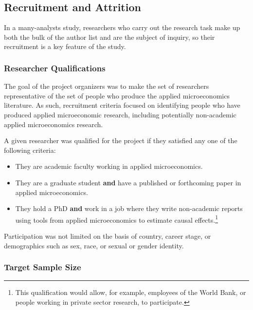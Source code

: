 \documentclass[
  letterpaper,
  DIV=11,
  numbers=noendperiod]{scrartcl}
\begin{document}
\hypertarget{recruitment-and-attrition}{%
\subsection{Recruitment and Attrition}\label{recruitment-and-attrition}}

In a many-analysts study, researchers who carry out the research task
make up both the bulk of the author list and are the subject of inquiry,
so their recruitment is a key feature of the study.

\hypertarget{researcher-qualifications}{%
\subsubsection{Researcher
Qualifications}\label{researcher-qualifications}}

The goal of the project organizers was to make the set of researchers
representative of the set of people who produce the applied
microeconomics literature. As such, recruitment criteria focused on
identifying people who have produced applied microeconomic research,
including potentially non-academic applied microeconomics research.

A given researcher was qualified for the project if they satisfied any
one of the following criteria:

\begin{itemize}
\item
  They are academic faculty working in applied microeconomics.
\item
  They are a graduate student \textbf{and} have a published or
  forthcoming paper in applied microeconomics.
\item
  They hold a PhD \textbf{and} work in a job where they write
  non-academic reports using tools from applied microeconomics to
  estimate causal effects.\footnote{This qualification would allow, for
    example, employees of the World Bank, or people working in private
    sector research, to participate.}
\end{itemize}

Participation was not limited on the basis of country, career stage, or
demographics such as sex, race, or sexual or gender identity.

\hypertarget{sec-target-sample}{%
\subsubsection{Target Sample Size}\label{sec-target-sample}}
\end{document}
